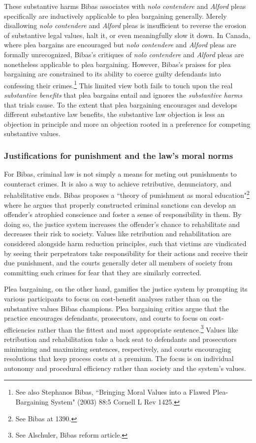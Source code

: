 These substantive harms Bibas associates with \textit{nolo contendere} and \textit{Alford} pleas specifically are inductively applicable to plea bargaining generally. Merely disallowing \textit{nolo contendere} and \textit{Alford} pleas is insufficient to reverse the erosion of substantive legal values, halt it, or even meaningfully slow it down. In Canada, where plea bargains are encouraged but \textit{nolo contendere} and \textit{Alford} pleas are formally unrecognized, Bibas's critiques of \textit{nolo contendere} and \textit{Alford} pleas are nonetheless applicable to plea bargaining. However, Bibas's praises for plea bargaining are constrained to its ability to coerce guilty defendants into confessing their crimes.\footnote{See also Stephanos Bibas, ``Bringing Moral Values into a Flawed Plea-Bargaining System" (2003) 88:5 Cornell L Rev 1425. } This limited view both fails to touch upon the real \textit{substantive benefits} that plea bargains entail and ignores the \textit{substantive harms} that trials cause. To the extent that plea bargaining encourages and develops different substantive law benefits, the substantive law objection is less an objection in principle and more an objection rooted in a preference for competing substantive values.

\subsubsection{Justifications for punishment and the law's moral norms}

For Bibas, criminal law is not simply a means for meting out punishments to counteract crimes. It is also a way to achieve retributive, denunciatory, and rehabilitative ends. Bibas proposes a ``theory of punishment as moral education"\footnote{See Bibas at 1390.} where he argues that properly constructed criminal sanctions can develop an offender's atrophied conscience and foster a sense of responsibility in them. By doing so, the justice system increases the offender's chance to rehabilitate and decreases their risk to society. Values like retribution and rehabilitation are considered alongside harm reduction principles, such that victims are vindicated by seeing their perpetrators take responsibility for their actions and receive their due punishment, and the courts generally deter all members of society from committing such crimes for fear that they are similarly corrected. 

Plea bargaining, on the other hand, gamifies the justice system by prompting its various participants to focus on cost-benefit analyses rather than on the substantive values Bibas champions. Plea bargaining critics argue that the practice encourages defendants, prosecutors, and courts to focus on cost-efficiencies rather than the fittest and most appropriate sentence.\footnote{See Alschuler, Bibas reform article.} Values like retribution and rehabilitation take a back seat to defendants and prosecutors minimizing and maximizing sentences, respectively, and courts encouraging resolutions that keep process costs at a premium. The focus is on individual autonomy and procedural efficiency rather than society and the system's values.

